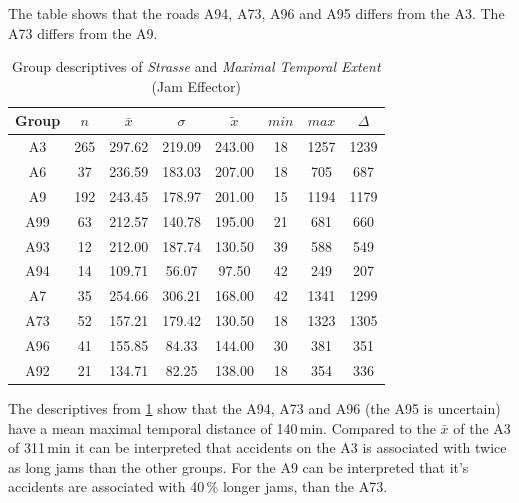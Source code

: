 The table shows that the roads A94, A73, A96 and A95 differs from the A3. The A73 differs from the A9.
\begin{table}[ht!]
	\tiny
	\centering
	\begin{tabular}{c|c|c|c|c|c|c|c}
		\toprule
		Group & $n$ & $\bar{x}$ & $\sigma$ & $\tilde{x}$ & $min$ & $max$ & $\Delta$ \\
		\midrule
		A3   & 265 & 297.62 & 219.09 & 243.00 & 18 & 1257 & 1239 \\ 
		A6   & 37  & 236.59 & 183.03 & 207.00 & 18 & 705  & 687  \\ 
		A9   & 192 & 243.45 & 178.97 & 201.00 & 15 & 1194 & 1179 \\ 
		A99  & 63  & 212.57 & 140.78 & 195.00 & 21 & 681  & 660  \\ 
		A93  & 12  & 212.00 & 187.74 & 130.50 & 39 & 588  & 549  \\ 
		A94  & 14  & 109.71 & 56.07  & 97.50  & 42 & 249  & 207  \\ 
		A7   & 35  & 254.66 & 306.21 & 168.00 & 42 & 1341 & 1299 \\ 
		A73  & 52  & 157.21 & 179.42 & 130.50 & 18 & 1323 & 1305 \\ 
		A96  & 41  & 155.85 & 84.33  & 144.00 & 30 & 381  & 351  \\ 
		A92  & 21  & 134.71 & 82.25  & 138.00 & 18 & 354  & 336 \\ 
		\bottomrule
	  \end{tabular}
    \caption{Group descriptives of \textit{Strasse} and \textit{Maximal Temporal Extent} (Jam Effector)}
    \label{tbl:descriptives_baysis_effector_Strasse_TMax}
\end{table}
The descriptives from \cref{tbl:descriptives_baysis_effector_Strasse_TMax} show that the A94, A73 and A96 (the A95 is uncertain) have a mean maximal temporal distance of 140\,min. Compared to the $\bar{x}$ of the A3 of 311\,min it can be interpreted that accidents on the A3 is associated with twice as long jams than the other groups. For the A9 can be interpreted that it's accidents are associated with 40\,\% longer jams, than the A73.

